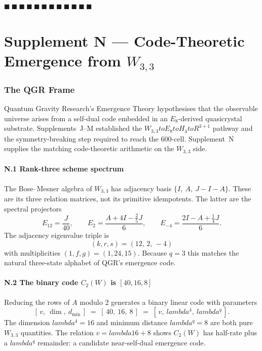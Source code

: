 \documentclass[12pt,a4paper]{article}
\def\mathbb#1{#1}%
\def\lambda{lambda}%
\def\cdot{ }%
\def\to{ to }%
\theoremstyle{definition}
\newcommand{\RR}{\mathbb{R}}
\begin{document}
\hfill $\blacksquare\ \blacksquare\ \blacksquare\ \blacksquare\ \blacksquare\ \blacksquare\ \blacksquare\ \blacksquare\ \blacksquare\ \blacksquare\ \blacksquare\ \blacksquare$

\clearpage
\part*{Supplement N --- Code-Theoretic Emergence from $W_{3,3}$}

\section*{The QGR Frame}

Quantum Gravity Research's Emergence Theory hypothesises that the
observable universe arises from a self-dual code embedded in an
$E_8$-derived quasicrystal substrate. Supplements~J--M
established the $W_{3,3} \to E_8 \to H_4 \to \RR^{3{+}1}$ pathway and
the symmetry-breaking step required to reach the $600$-cell.
Supplement~N supplies the matching code-theoretic arithmetic on the
$W_{3,3}$ side.

\subsection*{N.1 \quad Rank-three scheme spectrum}
The Bose--Mesner algebra of $W_{3,3}$ has adjacency basis
$\{I,\ A,\ J-I-A\}$.  These are its three relation matrices, not its
primitive idempotents.  The latter are the spectral projectors
\[
 E_{12}=\frac{J}{40},\qquad
 E_{2}=\frac{A+4I-\frac25J}{6},\qquad
 E_{-4}=\frac{2I-A+\frac14J}{6}.
\]
The adjacency
eigenvalue triple is
\[
\boxed{\;(k,r,s) = (12,\,2,\,-4)\;}
\]
with multiplicities $(1,f,g)=(1,24,15)$. Because $q=3$ this matches
the natural three-state alphabet of QGR's emergence code.

\subsection*{N.2 \quad The binary code $C_2(W)$ is $[40,16,8]$}
Reducing the rows of $A$ modulo 2 generates a binary linear code with
parameters
\[
[\,v,\ \dim,\ d_{\min}\,] \;=\; [\,40,\ 16,\ 8\,] \;=\; [\,v,\ \lambda^{4},\ \lambda^{q}\,].
\]
The dimension $\lambda^4=16$ and minimum distance $\lambda^q=8$ are
both pure $W_{3,3}$ quantities. The relation $v = \lambda\cdot 16 + 8$
shows $C_2(W)$ has half-rate plus a $\lambda^q$ remainder: a candidate
near-self-dual emergence code.
\end{document}
